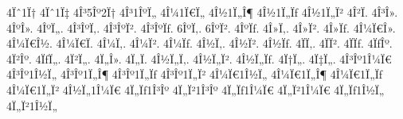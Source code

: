 {4Ïˆ1Ï†
4Ïˆ1Ï‡
4Î³5Îº2Ï†   %
4Î³1ÎºÏ„   %
4Î¼1Ï€Ï„   %
4Î½1Ï„Î¶   %
4Î½1Ï„Ïƒ 4Î½1Ï„Ï²   %
4Î²Ï.   %
4Î³Î».   %
4ÎºÎ».   %
4ÎºÏ„.   %
4Î³ÎºÏ‚. 4Î³ÎºÏ².   %
4Î³ÎºÏƒ.
6ÎºÏ‚. 6ÎºÏ².   %
4ÎºÏƒ.
4Î»Ï‚. 4Î»Ï².   %
4Î»Ïƒ.
4Î¼Ï€Î».   %
4Î¼Ï€Î½.   %
4Î¼Ï€Ï.   %
4Î¼Ï‚. 4Î¼Ï².   %
4Î¼Ïƒ.
4Î½Ï‚. 4Î½Ï².   %
4Î½Ïƒ.
4ÏÏ‚. 4ÏÏ².   %
4ÏÏƒ.
4ÏƒÎº. 4Ï²Îº.   %
4ÏƒÏ„. 4Ï²Ï„.   %
4Ï„Î».   %
4Ï„Ï.   %
4Î½Ï„Ï‚. 4Î½Ï„Ï².   %
4Î½Ï„Ïƒ.
4Ï†Ï„.   %
4Ï‡Ï„.   %
4Î³Îº1Î¼Ï€
4Î³Îº1Î½Ï„
4Î³Îº1Ï„Î¶
4Î³Îº1Ï„Ïƒ 4Î³Îº1Ï„Ï²
4Î¼Ï€1Î½Ï„
4Î¼Ï€1Ï„Î¶
4Î¼Ï€1Ï„Ïƒ 4Î¼Ï€1Ï„Ï²
4Î½Ï„1Î¼Ï€
4Ï„Ïƒ1Î³Îº 4Ï„Ï²1Î³Îº
4Ï„Ïƒ1Î¼Ï€ 4Ï„Ï²1Î¼Ï€
4Ï„Ïƒ1Î½Ï„ 4Ï„Ï²1Î½Ï„
}
